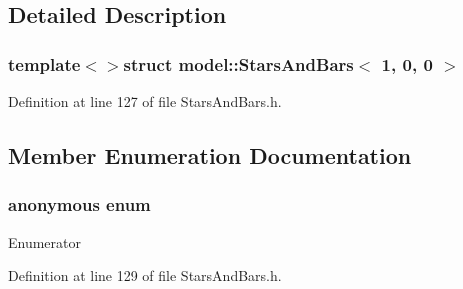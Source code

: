 \subsection{Detailed Description}
\subsubsection*{template$<$$>$struct model\+::\+Stars\+And\+Bars$<$ 1, 0, 0 $>$}



Definition at line 127 of file Stars\+And\+Bars.\+h.



\subsection{Member Enumeration Documentation}
\hypertarget{structmodel_1_1_stars_and_bars_3_011_00_010_00_010_01_4_ae1ce65e5986ff7b10dcb3ab6c5aaec18}{}\subsubsection[{anonymous enum}]{\setlength{\rightskip}{0pt plus 5cm}anonymous enum}\label{structmodel_1_1_stars_and_bars_3_011_00_010_00_010_01_4_ae1ce65e5986ff7b10dcb3ab6c5aaec18}
\begin{Desc}
\item[Enumerator]\par
\begin{description}
\item[{\em 
\hypertarget{structmodel_1_1_stars_and_bars_3_011_00_010_00_010_01_4_ae1ce65e5986ff7b10dcb3ab6c5aaec18a858931e33a777c10210460c11faa4a54}{}N\label{structmodel_1_1_stars_and_bars_3_011_00_010_00_010_01_4_ae1ce65e5986ff7b10dcb3ab6c5aaec18a858931e33a777c10210460c11faa4a54}
}]\end{description}
\end{Desc}


Definition at line 129 of file Stars\+And\+Bars.\+h.


